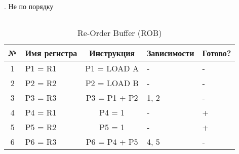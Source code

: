 \begin{frame}{\insertsubsubsection. Не по порядку}
\begin{columns}
    \begin{column}{.6\textwidth}
      \begin{table}[h]
        \begin{tabular}{|c|m{1.4cm}|c|m{1.3cm}|m{1cm}|}
          \hline
          №&Имя регистра&Инструкция&Зависи\-мости&Гото\-во?\\
          \hline%
          \rowcolor{Maroon}%
          \color{White}1&\color{White}P1 = R1&\color{White}P1 = LOAD A&\color{White}-&\color{White}-\\
          \hline%
          \rowcolor{Maroon}%
          \color{White}2&\color{White}P2 = R2&\color{White}P2 = LOAD B&\color{White}-&\color{White}-\\
          \hline%
          \rowcolor{Maroon}%
          \color{White}3&\color{White}P3 = R3&\color{White} P3 = P1 + P2&\color{White} 1, 2&\color{White}-\\
          \hline%
          \rowcolor{ForestGreen}%
          \color{White}4&\color{White}P4 = R1&\color{White}P4 = 1&\color{White}-&\color{White}+\\
          \hline%
          \rowcolor{ForestGreen}%
          \color{White}5&\color{White}P5 = R2&\color{White}P5 = 1&\color{White}-&\color{White}+\\
          \hline%
          \rowcolor{ForestGreen}%
          \color{White}6&\color{White}P6 = R3&\color{White}P6 = P4 + P5&\color{White}4, 5&\color{White}-\\
          \hline%
        \end{tabular}
        \caption{Re-Order Buffer (ROB)}
      \end{table}
    \end{column}
  \end{columns}


\end{frame}


